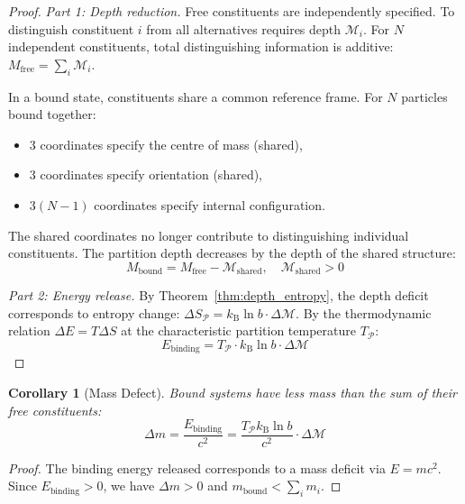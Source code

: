 \documentclass[twocolumn,10pt,a4paper]{article}
\theoremstyle{plain}
\newtheorem{corollary}[theorem]{Corollary}
\theoremstyle{definition}
\theoremstyle{remark}
\newcommand{\kB}{k_{\mathrm{B}}}
\newcommand{\Depth}{\mathcal{M}}
\newcommand{\Mfree}{M_{\mathrm{free}}}
\newcommand{\Mbound}{M_{\mathrm{bound}}}
\newcommand{\Partition}{\mathcal{P}}
\begin{document}
\begin{proof}
\emph{Part 1: Depth reduction.} Free constituents are independently specified. To distinguish constituent $i$ from all alternatives requires depth $\Depth_i$. For $N$ independent constituents, total distinguishing information is additive: $\Mfree = \sum_i \Depth_i$.

In a bound state, constituents share a common reference frame. For $N$ particles bound together:
\begin{itemize}
    \item 3 coordinates specify the centre of mass (shared),
    \item 3 coordinates specify orientation (shared),
    \item $3(N-1)$ coordinates specify internal configuration.
\end{itemize}
The shared coordinates no longer contribute to distinguishing individual constituents. The partition depth decreases by the depth of the shared structure:
\begin{equation}
    \Mbound = \Mfree - \Depth_{\mathrm{shared}}, \quad \Depth_{\mathrm{shared}} > 0
\end{equation}

\emph{Part 2: Energy release.} By Theorem~\ref{thm:depth_entropy}, the depth deficit corresponds to entropy change: $\Delta S_\Partition = \kB \ln b \cdot \Delta\Depth$. By the thermodynamic relation $\Delta E = T\Delta S$ at the characteristic partition temperature $T_\Partition$:
\begin{equation}
    E_{\mathrm{binding}} = T_\Partition \cdot \kB \ln b \cdot \Delta\Depth
\end{equation}
\end{proof}

\begin{corollary}[Mass Defect]
\label{cor:mass_defect}
Bound systems have less mass than the sum of their free constituents:
\begin{equation}
    \Delta m = \frac{E_{\mathrm{binding}}}{c^2} = \frac{T_\Partition \kB \ln b}{c^2} \cdot \Delta\Depth
\end{equation}
\end{corollary}

\begin{proof}
The binding energy released corresponds to a mass deficit via $E = mc^2$. Since $E_{\mathrm{binding}} > 0$, we have $\Delta m > 0$ and $m_{\mathrm{bound}} < \sum_i m_i$.
\end{proof}
\end{document}
